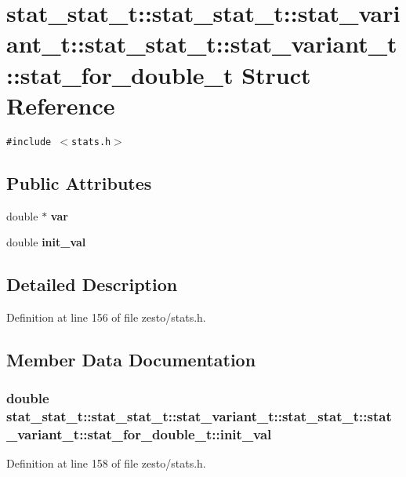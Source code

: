\section{stat\_\-stat\_\-t::stat\_\-stat\_\-t::stat\_\-variant\_\-t::stat\_\-stat\_\-t::stat\_\-variant\_\-t::stat\_\-for\_\-double\_\-t Struct Reference}
\label{structstat__stat__t_1_1stat__variant__t_1_1stat__for__double__t}
{\tt \#include $<$stats.h$>$}

\subsection*{Public Attributes}
\begin{CompactItemize}
\item 
double $\ast$ {\bf var}
\item 
double {\bf init\_\-val}
\end{CompactItemize}


\subsection{Detailed Description}


Definition at line 156 of file zesto/stats.h.

\subsection{Member Data Documentation}
\subsubsection[{init\_\-val}]{\setlength{\rightskip}{0pt plus 5cm}double stat\_\-stat\_\-t::stat\_\-stat\_\-t::stat\_\-variant\_\-t::stat\_\-stat\_\-t::stat\_\-variant\_\-t::stat\_\-for\_\-double\_\-t::init\_\-val}\label{structstat__stat__t_1_1stat__variant__t_1_1stat__for__double__t_62951000571da0597392fc6e53fc848c}




Definition at line 158 of file zesto/stats.h.
